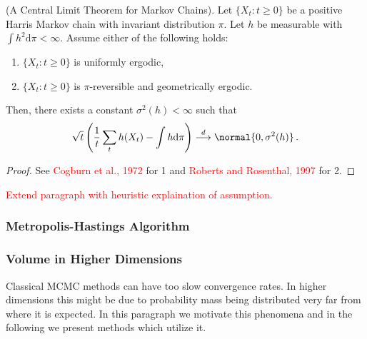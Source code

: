 \begin{theorem}{(A Central Limit Theorem for Markov Chains).}
  Let $\{X_t: t \geqslant 0 \}$ be a positive Harris Markov chain with invariant distribution $\pi$.
  Let $h$ be measurable with $\int h^2 \mathrm{d}\pi < \infty$.
  Assume either of the following holds:
  \begin{enumerate}
    \item $\{X_t: t \geqslant 0\}$ is uniformly ergodic,
    \item $\{X_t: t \geqslant 0\}$ is $\pi$-reversible and geometrically ergodic.
  \end{enumerate}
  Then, there exists a constant $\sigma^2(h) < \infty$ such that
  \begin{align}
    \sqrt{t}\left(\frac{1}{t}\sum_t h(X_t) - \int h \mathrm{d}\pi \right) \overset{d}{\longrightarrow} \normal{0, \sigma^2(h)} \,.
  \end{align}
\end{theorem}
\begin{proof}
  See \textcolor{red}{Cogburn et al., 1972} for 1 and \textcolor{red}{Roberts and Rosenthal, 1997} for 2.
\end{proof}
\textcolor{red}{Extend paragraph with heuristic explaination of assumption.}

\subsubsection*{Metropolis-Hastings Algorithm}

\subsubsection*{Volume in Higher Dimensions}
Classical MCMC methods can have too slow convergence rates.
In higher dimensions this might be due to probability mass being distributed very far from where it is expected.
In this paragraph we motivate this phenomena and in the following we present methods which utilize it.

